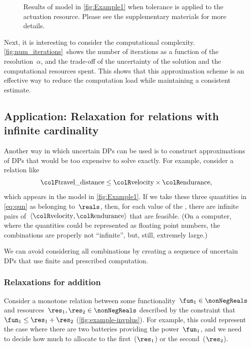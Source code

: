 \begin{figure}[h]
{    }

    \caption{Results of model in \cref{fig:Example1} when tolerance is applied
    to the actuation  resource. Please see the supplementary
    materials for more details.}
\end{figure}

Next, it is interesting to consider the computational complexity.
\cref{fig:num_iterations}~shows the number of iterations as
a function of the resolution~$\alpha$, and the trade-off of the
uncertainty of the solution and the computational resources spent.
This shows that this approximation scheme is an effective way to reduce
the computation load while maintaining a consistent estimate.


\subsection{Application: Relaxation for relations with infinite cardinality\label{sec:Application-relax}}

Another way in which uncertain DPs can be used is to construct approximations
of DPs that would be too expensive to solve exactly. For example,
consider a relation like
\begin{equation}
{\colF\text{travel\_distance}}
    \leq{\colR\text{velocity}}\times{\colR\text{endurance}},\label{eq:qun}
\end{equation}
which appears in the model in \cref{fig:Example1}. If we take
these three quantities in \cref{eq:qun} as belonging to~$\reals$,
then, for each value of the , there are infinite
pairs of~$\left\langle {\colR\text{velocity}},{\colR\text{endurance}}\right\rangle $
that are feasible. (On a computer, where the quantities could be represented
as floating point numbers, the combinations are properly not ``infinite'',
but, still, extremely large.)

We can avoid considering all combinations by creating a sequence of
uncertain DPs that use finite and prescribed computation.

\subsubsection{Relaxations for addition}

Consider a monotone relation between some functionality~$\fun_{1}\in\nonNegReals$
and resources~$\res_{1},\res_{2}\in\nonNegReals$ described by
the constraint that~$\fun_{1}\leq\res_{1}+\res_{2}$ (\cref{fig:example-invplus}).
For example, this could represent the case where there are two batteries
providing the power~$\fun_{1}$, and we need to decide how much to
allocate to the first~($\res_{1}$) or the second~($\res_{2}$).

